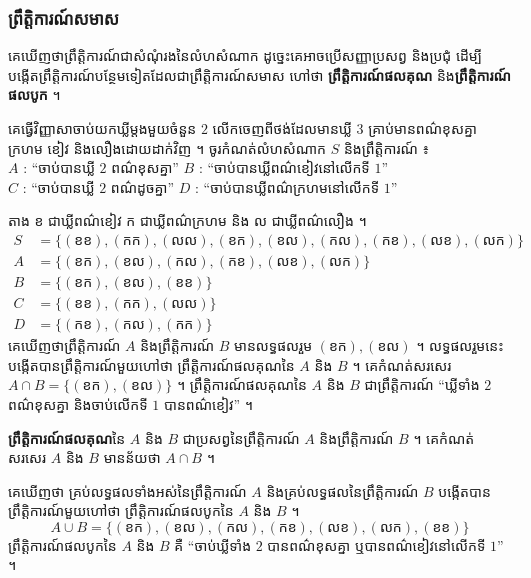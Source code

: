 \subsubsection{ព្រឹត្តិការណ៍សមាស}
គេឃើញថាព្រឹត្តិការណ៍ជាសំណុំរងនៃលំហសំណាក ដូច្នេះគេអាចប្រើសញ្ញាប្រសព្វ និងប្រជុំ ដើម្បីបង្កើតព្រឹត្តិការណ៍បន្ថែមទៀតដែលជាព្រឹត្តិការណ៍សមាស ហៅថា \textbf{ព្រឹត្តិការណ៍ផលគុណ} និង\textbf{ព្រឹត្តិការណ៍ផលបូក} ។

\begin{example}[ឧទាហរណ៍]
គេធ្វើវិញ្ញាសាចាប់យកឃ្លីម្ដងមួយចំនួន $2$ លើកចេញពីថង់ដែលមានឃ្លី $3$ គ្រាប់មានពណ៌ខុសគ្នា ក្រហម ខៀវ និងលឿងដោយដាក់វិញ ។ ចូរកំណត់លំហសំណាក $S$ និងព្រឹត្តិការណ៍ ៖\\
$A$ : “ចាប់បានឃ្លី $2$ ពណ៌ខុសគ្នា” \qquad $B$ : “ចាប់បានឃ្លីពណ៌ខៀវនៅលើកទី $1$”\\
$C$ : “ចាប់បានឃ្លី $2$ ពណ៌ដូចគ្នា” \qquad $D$ : “ចាប់បានឃ្លីពណ៌ក្រហមនៅលើកទី $1$”
\end{example}
តាង ខ ជាឃ្លីពណ៌ខៀវ ក ជាឃ្លីពណ៌ក្រហម និង ល ជាឃ្លីពណ៌លឿង ។
\[
\begin{aligned}
S &= \{(\text{ខខ}), (\text{កក}), (\text{លល}), (\text{ខក}), (\text{ខល}), (\text{កល}), (\text{កខ}), (\text{លខ}), (\text{លក})\}\\
A &= \{(\text{ខក}), (\text{ខល}), (\text{កល}), (\text{កខ}), (\text{លខ}), (\text{លក})\}\\
B &= \{(\text{ខក}), (\text{ខល}), (\text{ខខ})\}\\
C &= \{(\text{ខខ}), (\text{កក}), (\text{លល})\}\\
D &= \{(\text{កខ}), (\text{កល}), (\text{កក})\}
\end{aligned}
\]
គេឃើញថាព្រឹត្តិការណ៍ $A$ និងព្រឹត្តិការណ៍ $B$ មានលទ្ធផលរួម $(\text{ខក}), (\text{ខល})$ ។ លទ្ធផលរួមនេះបង្កើតបានព្រឹត្តិការណ៍មួយហៅថា ព្រឹត្តិការណ៍ផលគុណនៃ $A$ និង $B$ ។ គេកំណត់សរសេរ $A \cap B = \{(\text{ខក}), (\text{ខល})\}$ ។ ព្រឹត្តិការណ៍ផលគុណនៃ $A$ និង $B$ ជាព្រឹត្តិការណ៍ “ឃ្លីទាំង $2$ ពណ៌ខុសគ្នា និងចាប់លើកទី $1$ បានពណ៌ខៀវ” ។

\begin{definition}[និយមន័យ]
\textbf{ព្រឹត្តិការណ៍ផលគុណ}នៃ $A$ និង $B$ ជាប្រសព្វនៃព្រឹត្តិការណ៍ $A$ និងព្រឹត្តិការណ៍ $B$ ។ គេកំណត់សរសេរ $A$ និង $B$ មានន័យថា $A \cap B$ ។
\end{definition}

គេឃើញថា គ្រប់លទ្ធផលទាំងអស់នៃព្រឹត្តិការណ៍ $A$ និងគ្រប់លទ្ធផលនៃព្រឹត្តិការណ៍ $B$ បង្កើតបានព្រឹត្តិការណ៍មួយហៅថា ព្រឹត្តិការណ៍ផលបូកនៃ $A$ និង $B$ ។
\[
A \cup B = \{(\text{ខក}), (\text{ខល}), (\text{កល}), (\text{កខ}), (\text{លខ}), (\text{លក}), (\text{ខខ})\}
\]
ព្រឹត្តិការណ៍ផលបូកនៃ $A$ និង $B$ គឺ “ចាប់ឃ្លីទាំង $2$ បានពណ៌ខុសគ្នា ឬបានពណ៌ខៀវនៅលើកទី $1$” ។

